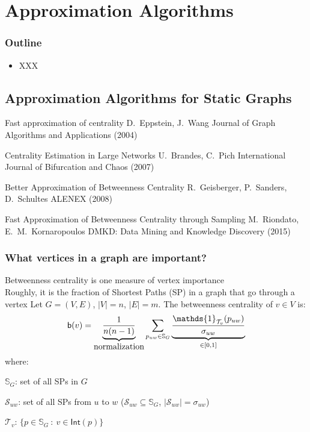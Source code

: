 \section{Approximation Algorithms}
\begin{frame}
  \frametitle{Outline}
  \begin{itemize}
    \item XXX
  \end{itemize}
\end{frame}

\subsection{Approximation Algorithms for Static Graphs}

\begin{frame}
  \centering
  \vfill
  {\huge Fast approximation of centrality}
  \vfill
  {\Large D.~Eppstein, J.~Wang}
  \vfill
  {\large Journal of Graph Algorithms and Applications (2004)}
  \vfill
\end{frame}

\begin{frame}
  \centering
  \vfill
  {\Huge Centrality Estimation in Large Networks}
  \vfill
  {\Large U.~Brandes, C.~Pich}
  \vfill
  {\large International Journal of Bifurcation and Chaos (2007)}
  \vfill
\end{frame}

\begin{frame}
  \centering
  \vfill
  {\huge Better Approximation of Betweenness Centrality}
  \vfill
  {\Large R.~Geisberger, P.~Sanders, D.~Schultes}
  \vfill
  {\large ALENEX (2008)}
  \vfill
\end{frame}

\begin{frame}
  \centering
  \vfill
  {\huge Fast Approximation of Betweenness Centrality through Sampling}
  \vfill
  {\Large M.~Riondato, E.~M.~Kornaropoulos}
  \vfill
  {\large DMKD: Data Mining and Knowledge Discovery (2015)}
  \vfill
\end{frame}

\begin{frame}
  \frametitle{What vertices in a graph are important?}
  Betweenness centrality is one measure of vertex importance\\
  \quad Roughly, it is the fraction of Shortest Paths (SP) in a graph that go through a vertex
  \vfill
  Let $G=(V,E)$, $|V|=n$, $|E|=m$. The betweenness centrality of $v\in V$ is:
  \[
    \betw(v)=\underbrace{\frac{1}{n(n-1)}}_{\mbox{normalization}}\sum_{p_{uw}\in\mathbb{S}_G}
    \underbrace{\frac{\mathds{1}_{\mathcal{T}_v}(p_{uw})}{\sigma_{uw}}}_{\in [0,1]}
  \]
  where:
  \begin{itemize*}
    \item $\mathbb{S}_G$: set of all SPs in $G$
    \item $\mathcal{S}_{uw}$: set of all SPs from $u$ to $w$
      ($\mathcal{S}_{uw}\subseteq\mathbb{S}_G$,
      $|\mathcal{S}_{uw}|=\sigma_{uw}$)
    \item $\mathcal{T}_v$: $\{p\in\mathbb{S}_G ~:~ v\in\mathsf{Int}(p)\}$
  \end{itemize*}
\end{frame}

